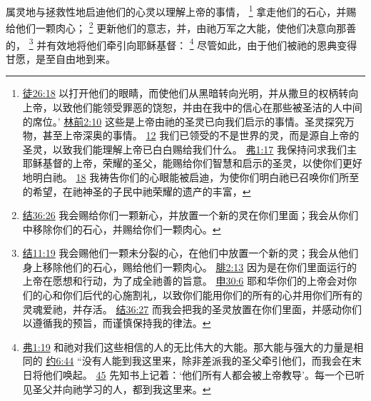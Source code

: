 \documentclass[12pt, a4paper, oneside]{ctexart}
\begin{document}
	属灵地与拯救性地启迪他们的心灵以理解上帝的事情，
	\footnote {
		\href{https://biblehub.com/acts/26-18.htm}{徒26:18} 以打开他们的眼睛，而使他们从黑暗转向光明，并从撒旦的权柄转向上帝，以致他们能领受罪恶的饶恕，并由在我中的信心在那些被圣洁的人中间的席位。’
		\href{https://biblehub.com/1_corinthians/2-10.htm}{林前2:10} 这些是上帝由祂的圣灵已向我们启示的事情。圣灵探究万物，甚至上帝深奥的事情。
		\href{https://biblehub.com/1_corinthians/2-12.htm}{12} 我们已领受的不是世界的灵，而是源自上帝的圣灵，以致我们能理解上帝已白白赐给我们什么。
		\href{https://biblehub.com/ephesians/1-17.htm}{弗1:17} 我保持问求我们主耶稣基督的上帝，荣耀的圣父，能赐给你们智慧和启示的圣灵，以使你们更好地明白祂。
		\href{https://biblehub.com/ephesians/1-18.htm}{18} 我祷告你们的心眼能被启迪，为使你们明白祂已召唤你们所至的希望，在祂神圣的子民中祂荣耀的遗产的丰富，
	}
	拿走他们的石心，并赐给他们一颗肉心；
	\footnote {
		\href{https://biblehub.com/ezekiel/36-26.htm}{结36:26} 我会赐给你们一颗新心，并放置一个新的灵在你们里面；我会从你们中移除你们的石心，并赐给你们一颗肉心。
	}
	更新他们的意志，并，由祂万军之大能，使他们决意向那善的，
	\footnote {
		\href{https://biblehub.com/ezekiel/11-19.htm}{结11:19} 我会赐他们一颗未分裂的心，在他们中放置一个新的灵；我会从他们身上移除他们的石心，赐给他们一颗肉心。
		\href{https://biblehub.com/philippians/2-13.htm}{腓2:13} 因为是在你们里面运行的上帝在愿想和行动，为了成全祂善的旨意。
		\href{https://biblehub.com/deuteronomy/30-6.htm}{申30:6} 耶和华你们的上帝会对你们的心和你们后代的心施割礼，以致你们能用你们的所有的心并用你们所有的灵魂爱祂，并存活。
		\href{https://biblehub.com/ezekiel/36-27.htm}{结36:27} 而我会把我的圣灵放置在你们里面，并感动你们以遵循我的预旨，而谨慎保持我的律法。
	}
	并有效地将他们牵引向耶稣基督：
	\footnote {
		\href{https://biblehub.com/ephesians/1-19.htm}{弗1:19} 和祂对我们这些相信的人的无比伟大的大能。那大能与强大的力量是相同的
		\href{https://biblehub.com/john/6-44.htm}{约6:44} “没有人能到我这里来，除非差派我的圣父牵引他们，而我会在末日将他们唤起。
		\href{https://biblehub.com/john/6-45.htm}{45} 先知书上记着：‘他们所有人都会被上帝教导’。每一个已听见圣父并向祂学习的人，都到我这里来。
	}
	尽管如此，由于他们被祂的恩典变得甘愿，是至自由地到来。
\end{document}
